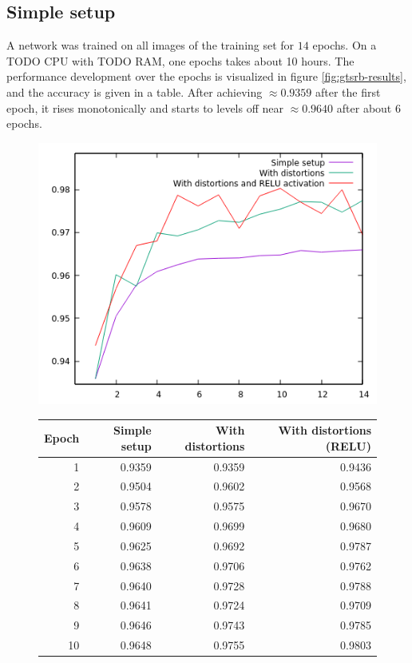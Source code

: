 \documentclass[11pt, a4paper]{article}
\begin{document}
\subsection{Simple setup}
\label{subsec:simplesetup}
A network was trained on all images of the training set for $14$ epochs. On a TODO CPU with TODO RAM, one epochs takes about 10 hours. The performance development over the epochs is visualized in figure \ref{fig:gtsrb-results}, and the accuracy is given in a table. After achieving $\approx 0.9359$ after the first epoch, it rises monotonically and starts to levels off near $\approx 0.9640$ after about 6 epochs.

\begin{figure}[h!]
	\centering
	\includegraphics{gtsrb_results}
	\begin{tabular}{|r|rrr|}
		\hline
		Epoch & Simple setup & With distortions & With distortions (RELU) \\
		\hline
		1 & 0.9359 & 0.9359 & 0.9436 \\
		2 & 0.9504 & 0.9602 & 0.9568 \\
		3 & 0.9578 & 0.9575 & 0.9670 \\
		4 & 0.9609 & 0.9699 & 0.9680 \\
		5 & 0.9625 & 0.9692 & 0.9787 \\
		6 & 0.9638 & 0.9706 & 0.9762 \\
		7 & 0.9640 & 0.9728 & 0.9788 \\
		8 & 0.9641 & 0.9724 & 0.9709 \\
		9 & 0.9646 & 0.9743 & 0.9785 \\
		10 & 0.9648 & 0.9755 & 0.9803 \\

\end{tabular}
\end{figure}
\end{document}
